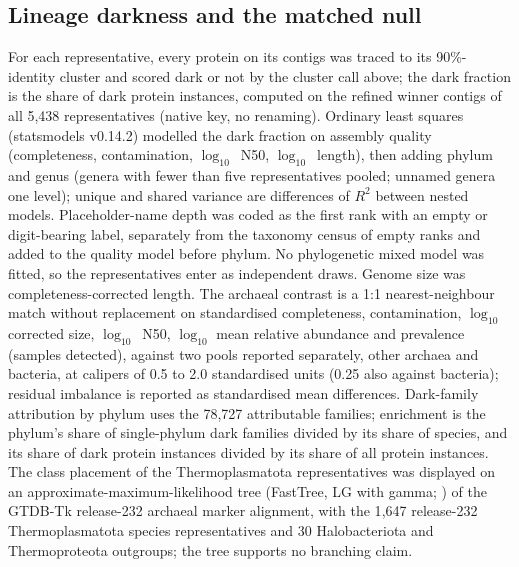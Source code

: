 \documentclass[11pt]{article}
\begin{document}
\subsection*{Lineage darkness and the matched null}
For each representative, every protein on its contigs was traced to its 90\%-identity cluster and
scored dark or not by the cluster call above; the dark fraction is the share of dark protein
instances, computed on the refined winner contigs of all 5{,}438 representatives (native key, no
renaming). Ordinary least squares (statsmodels v0.14.2) modelled the dark fraction on assembly quality
(completeness, contamination, $\log_{10}$~N50, $\log_{10}$~length), then adding phylum and genus
(genera with fewer than five representatives pooled; unnamed genera one level); unique and shared
variance are differences of $R^2$ between nested models. Placeholder-name depth was coded as the first rank with an empty or digit-bearing label, separately from the taxonomy census of empty ranks and added to the quality model before phylum. No
phylogenetic mixed model was fitted, so the representatives enter as independent draws. Genome size
was completeness-corrected length. The archaeal contrast is a 1:1 nearest-neighbour match without
replacement on standardised completeness, contamination, $\log_{10}$ corrected size,
$\log_{10}$~N50, $\log_{10}$ mean relative abundance and prevalence (samples detected), against two
pools reported separately, other archaea and bacteria, at calipers of 0.5 to 2.0 standardised units
(0.25 also against bacteria); residual imbalance is reported as standardised mean differences. Dark-family attribution by
phylum uses the 78{,}727 attributable families; enrichment is the phylum's share of single-phylum
dark families divided by its share of species, and its share of dark protein instances divided by
its share of all protein instances. The class placement of the Thermoplasmatota representatives was
displayed on an approximate-maximum-likelihood tree (FastTree, LG with gamma; \citealp{price2010fasttree}) of the GTDB-Tk
release-232 archaeal marker alignment, with the 1{,}647 release-232 Thermoplasmatota species
representatives and 30 Halobacteriota and Thermoproteota outgroups; the tree supports no branching
claim.
\end{document}
